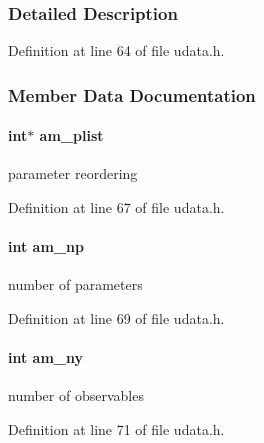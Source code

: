 \subsubsection{Detailed Description}


Definition at line 64 of file udata.\+h.



\subsubsection{Member Data Documentation}
\hypertarget{struct_user_data_a122fcb4f213656e29d30e1e8713fcf1c}{}
\paragraph[{am\+\_\+plist}]{\setlength{\rightskip}{0pt plus 5cm}int$\ast$ am\+\_\+plist}\label{struct_user_data_a122fcb4f213656e29d30e1e8713fcf1c}
parameter reordering 

Definition at line 67 of file udata.\+h.

\hypertarget{struct_user_data_a1b32993ff88dfae4dd2aab311c24cc26}{}
\paragraph[{am\+\_\+np}]{\setlength{\rightskip}{0pt plus 5cm}int am\+\_\+np}\label{struct_user_data_a1b32993ff88dfae4dd2aab311c24cc26}
number of parameters 

Definition at line 69 of file udata.\+h.

\hypertarget{struct_user_data_a1c8d4eb301c60c34dc4870faca7ce5a4}{}
\paragraph[{am\+\_\+ny}]{\setlength{\rightskip}{0pt plus 5cm}int am\+\_\+ny}\label{struct_user_data_a1c8d4eb301c60c34dc4870faca7ce5a4}
number of observables 

Definition at line 71 of file udata.\+h.

\hypertarget{struct_user_data_a00ba9cf99f8f02b663241bb76b76ce96}{}
